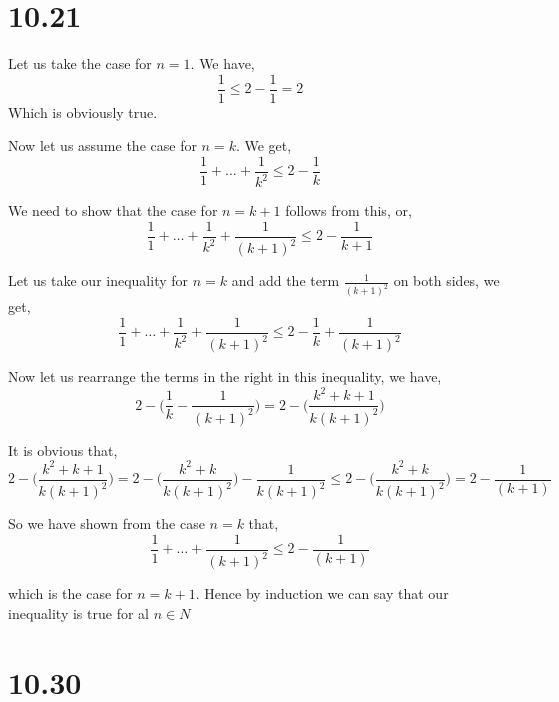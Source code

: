 \documentclass[a4paper]{report}
\begin{document}
\section*{10.21}
Let us take the case for $n = 1$. We have, 
$$ \frac{1}{1} \le 2 - \frac{1}{1} = 2 $$ 
Which is obviously true.

Now let us assume the case for $n = k$. We get, 
$$ \frac{1}{1} + \dots + \frac{1}{k^2} \le 2 - \frac{1}{k} $$ 

We need to show that the case for $n = k + 1$ follows from this, or, 
$$ \frac{1}{1} + \dots+ \frac{1}{k^2} + \frac{1}{(k + 1)^2} \le 2 - \frac{1}{k + 1} $$ 

Let us take our inequality for $n = k$ and add the term $\frac{1}{(k + 1)^2}$ on both sides, we get, 
$$ \frac{1}{1} + \dots + \frac{1}{k^2} + \frac{1}{(k + 1)^2} \le 2 - \frac{1}{k} + \frac{1}{(k + 1)^2} $$ 

Now let us rearrange the terms in the right in this inequality, we have, 
$$ 2 - \bigg (\frac{1}{k} - \frac{1}{(k + 1)^2}\bigg ) = 2 - \bigg(\frac{k^2 + k + 1}{k(k +1)^2} \bigg) $$ 

It is obvious that, 
$$ 2 - \bigg(\frac{k^2 + k + 1}{k(k +1)^2} \bigg) =  2 - \bigg(\frac{k^2 + k}{k(k +1)^2} \bigg) - \frac{1}{k(k+1)^2} \le 2 - \bigg (\frac{k^2 + k}{k(k + 1)^2} \bigg) = 2 - \frac{1}{(k+1)} $$ 

So we have shown from the case $n = k$ that,  
$$ \frac{1}{1} + \dots + \frac{1}{(k + 1)^2} \le 2 - \frac{1}{(k + 1)} $$

which is the case for $n = k + 1$. Hence by induction we can say that our inequality is true for al $n \in N$

\section*{10.30}
\end{document}
